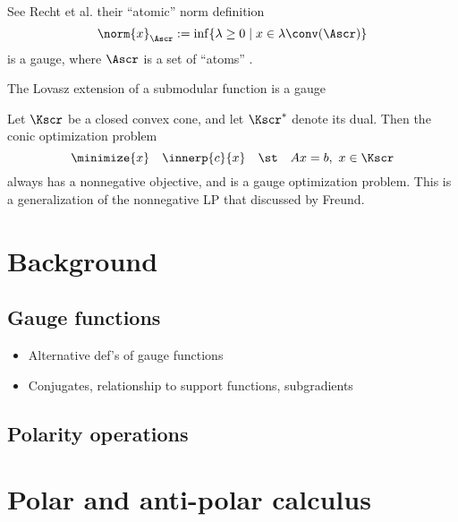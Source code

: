 \documentclass{siamltex}   %
\begin{document}
  \begin{example}
    See Recht et al.  their ``atomic'' norm definition
    \[
    \norm{x}_{\Ascr} := \inf\{ \lambda\ge0 \mid x\in\lambda\conv(\Ascr)\}
    \]
    is a gauge, where $\Ascr$ is a set of ``atoms'' \cite{Chan:2012}.
  \end{example}

  \begin{example}
    The Lovasz extension of a submodular function is a gauge
  \end{example}

  \begin{example}
    Let $\Kscr$ be a closed convex cone, and let $\Kscr^{*}$ denote
    its dual. Then the conic optimization problem
    \begin{equation}
      \label{eq:2}
      \minimize{x} \quad \innerp{c}{x} \quad\st\quad Ax = b,\ x\in\Kscr
    \end{equation}
    always has a nonnegative objective, and is a gauge optimization
    problem. This is a generalization of the nonnegative LP that
    discussed by Freund.
  \end{example}

  \section{Background}

  \subsection{Gauge functions}
  \label{sec:gauges}

  \begin{itemize}
  \item Alternative def's of gauge functions
  \item Conjugates, relationship to support functions,  subgradients
  \end{itemize}

  \subsection{Polarity operations}
  \label{sec:polarity-operations}

  \section{Polar and anti-polar calculus}
  \label{sec:polar-anti-polar}
\end{document}
